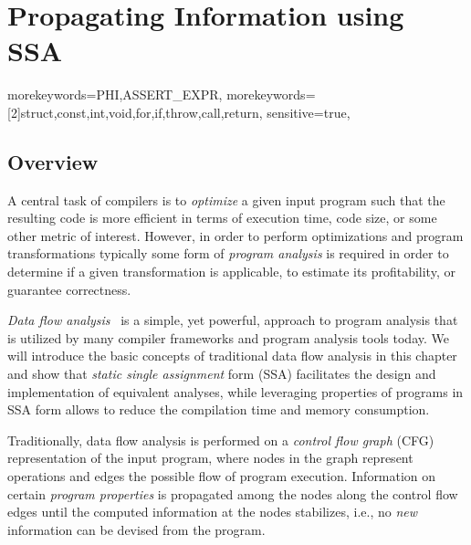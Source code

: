 \providecommand\lcode{\begingroup \small\urlstyle{tt}\Url}
\providecommand\lident{\begingroup \small\urlstyle{tt}\Url}

\chapter{Propagating Information using SSA}
\newcommand{\obacht}[2]{\marginpar{\tiny\textbf{#1:} #2}}

\graphicspath{{img/}{constant_propagation_is_easier/img/}{part3/constant_propagation_is_easier/img/}}

{
  morekeywords={PHI,ASSERT_EXPR},
  morekeywords=[2]{struct,const,int,void,for,if,throw,call,return},
  sensitive=true,
}

\lstset{
  mathescape=true,
  language=DNlisting,
  basicstyle=\small,
  keywordstyle=\ttfamily,
  keywordstyle=[2]\bfseries,
  numbers=left
}

\section{Overview}

A central task of compilers is to \emph{optimize} a given input program such
that the resulting code is more efficient in terms of execution time, code size,
or some other metric of interest. However, in order to perform optimizations and
program transformations typically some form of \emph{program analysis} is
required in order to determine if a given transformation is applicable, to
estimate its profitability, or guarantee correctness.

\emph{Data flow analysis}~\cite{novillo:bib:NNH99} is a simple, yet powerful,
approach to program analysis that is utilized by many compiler frameworks and
program analysis tools today. We will introduce the basic concepts of
traditional data flow analysis in this chapter and show that \emph{static single
assignment} form (SSA) facilitates the design and implementation of equivalent
analyses, while leveraging properties of programs in SSA form allows to reduce
the compilation time and memory consumption.

Traditionally, data flow analysis is performed on a \emph{control flow graph}
(CFG) representation of the input program, where nodes in the graph represent
operations and edges the possible flow of program execution.
Information on certain \emph{program properties} is propagated among
the nodes along the control flow edges until the computed information at the
nodes stabilizes, i.e., no \emph{new} information can be devised from the
program.

